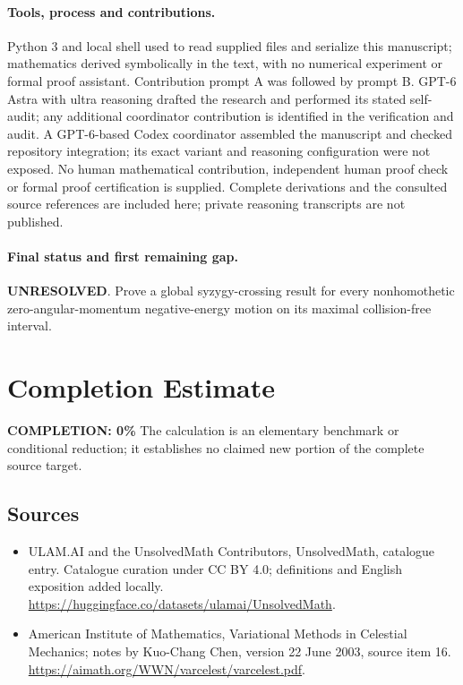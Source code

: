 \documentclass[11pt]{article}
\begin{document}
\paragraph{Tools, process and contributions.}
Python 3 and local shell used to read supplied files and serialize this manuscript; mathematics derived symbolically in the text, with no numerical experiment or formal proof assistant. Contribution prompt A was followed by prompt B. GPT-6 Astra with ultra reasoning drafted the research and performed its stated self-audit; any additional coordinator contribution is identified in the verification and audit. A GPT-6-based Codex coordinator assembled the manuscript and checked repository integration; its exact variant and reasoning configuration were not exposed. No human mathematical contribution, independent human proof check or formal proof certification is supplied. Complete derivations and the consulted source references are included here; private reasoning transcripts are not published.

\paragraph{Final status and first remaining gap.}
\textbf{UNRESOLVED}. Prove a global syzygy-crossing result for every nonhomothetic zero-angular-momentum negative-energy motion on its maximal collision-free interval.

\section{Completion Estimate}
\noindent\textbf{COMPLETION: 0\%}
The calculation is an elementary benchmark or conditional reduction; it establishes no claimed new portion of the complete source target.

\subsection{Sources}
\begin{itemize}
\item[\hypertarget{source:statement:1}{S1}] ULAM.AI and the UnsolvedMath Contributors, UnsolvedMath, catalogue entry. Catalogue curation under CC BY 4.0; definitions and English exposition added locally.
\url{https://huggingface.co/datasets/ulamai/UnsolvedMath}.
\item[\hypertarget{source:statement:2}{S2}] American Institute of Mathematics, Variational Methods in Celestial Mechanics; notes by Kuo-Chang Chen, version 22 June 2003, source item 16.
\url{https://aimath.org/WWN/varcelest/varcelest.pdf}.
\end{itemize}
\label{end:statement}
\end{document}
